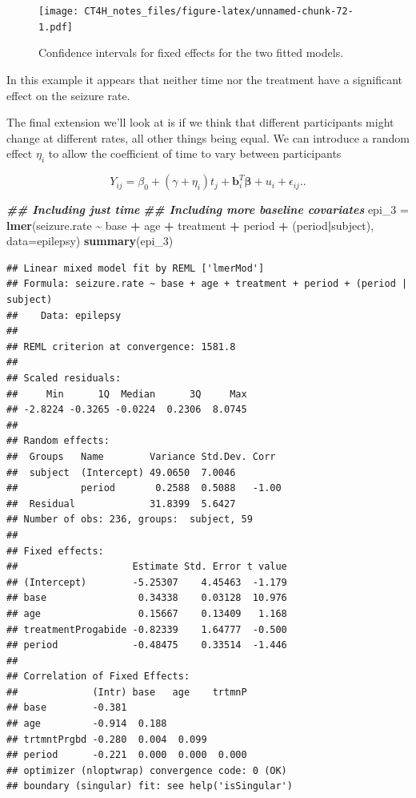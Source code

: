 \documentclass[
  openany]{book}
\newenvironment{Shaded}{\begin{snugshade}}{\end{snugshade}}
\newcommand{\AttributeTok}[1]{\textcolor[rgb]{0.13,0.29,0.53}{#1}}
\newcommand{\DocumentationTok}[1]{\textcolor[rgb]{0.56,0.35,0.01}{\textbf{\textit{#1}}}}
\newcommand{\FunctionTok}[1]{\textcolor[rgb]{0.13,0.29,0.53}{\textbf{#1}}}
\newcommand{\NormalTok}[1]{#1}
\newcommand{\OtherTok}[1]{\textcolor[rgb]{0.56,0.35,0.01}{#1}}
\newcommand{\SpecialCharTok}[1]{\textcolor[rgb]{0.81,0.36,0.00}{\textbf{#1}}}
\theoremstyle{definition}
\theoremstyle{definition}
\theoremstyle{definition}
\theoremstyle{definition}
\theoremstyle{remark}
\begin{document}
\begin{figure}
\centering
\texttt{[image: CT4H\_notes\_files/figure-latex/unnamed-chunk-72-1.pdf]}
\caption{\label{fig:unnamed-chunk-72}Confidence intervals for fixed effects for the two fitted models.}
\end{figure}

In this example it appears that neither time nor the treatment have a significant effect on the seizure rate.

The final extension we'll look at is if we think that different participants might change at different rates, all other things being equal. We can introduce a random effect \(\eta_i\) to allow the coefficient of time to vary between participants

\begin{equation}
Y_{ij} = \beta_0 + \left(\gamma + \eta_i\right) t_j + \mathbf{b}_i^T\boldsymbol\beta + u_{i} + \epsilon_{ij}.
\label{eq:lmer3}.
\end{equation}

\begin{Shaded}
\begin{Highlighting}[]
\DocumentationTok{\#\# Including just time}
\DocumentationTok{\#\# Including more baseline covariates}
\NormalTok{epi\_3 }\OtherTok{=} \FunctionTok{lmer}\NormalTok{(seizure.rate }\SpecialCharTok{\textasciitilde{}}\NormalTok{ base }\SpecialCharTok{+}\NormalTok{ age }\SpecialCharTok{+}\NormalTok{ treatment }\SpecialCharTok{+}\NormalTok{ period }\SpecialCharTok{+}\NormalTok{ (period}\SpecialCharTok{|}\NormalTok{subject), }\AttributeTok{data=}\NormalTok{epilepsy)}
\FunctionTok{summary}\NormalTok{(epi\_3)}
\end{Highlighting}
\end{Shaded}

\begin{verbatim}
## Linear mixed model fit by REML ['lmerMod']
## Formula: seizure.rate ~ base + age + treatment + period + (period | subject)
##    Data: epilepsy
## 
## REML criterion at convergence: 1581.8
## 
## Scaled residuals: 
##     Min      1Q  Median      3Q     Max 
## -2.8224 -0.3265 -0.0224  0.2306  8.0745 
## 
## Random effects:
##  Groups   Name        Variance Std.Dev. Corr 
##  subject  (Intercept) 49.0650  7.0046        
##           period       0.2588  0.5088   -1.00
##  Residual             31.8399  5.6427        
## Number of obs: 236, groups:  subject, 59
## 
## Fixed effects:
##                    Estimate Std. Error t value
## (Intercept)        -5.25307    4.45463  -1.179
## base                0.34338    0.03128  10.976
## age                 0.15667    0.13409   1.168
## treatmentProgabide -0.82339    1.64777  -0.500
## period             -0.48475    0.33514  -1.446
## 
## Correlation of Fixed Effects:
##             (Intr) base   age    trtmnP
## base        -0.381                     
## age         -0.914  0.188              
## trtmntPrgbd -0.280  0.004  0.099       
## period      -0.221  0.000  0.000  0.000
## optimizer (nloptwrap) convergence code: 0 (OK)
## boundary (singular) fit: see help('isSingular')
\end{verbatim}
\end{document}
